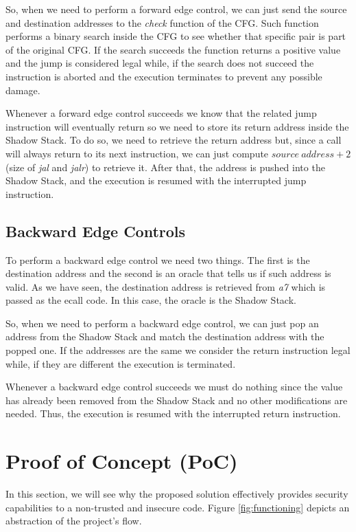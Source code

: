 So, when we need to perform a forward edge control, we can just send the source and
destination addresses to the \textit{check} function of the CFG. Such function performs
a binary search inside the CFG to see whether that specific pair is part of the original
CFG. If the search succeeds the function returns a positive value and the jump
is considered legal while, if the search does not succeed the instruction is aborted
and the execution terminates to prevent any possible damage.

Whenever a forward edge control succeeds we know that the related jump instruction
will eventually return so we need to store its return address inside the Shadow Stack.
To do so, we need to retrieve the return address but, since a call will always
return to its next instruction, we can just compute $source \ address + 2$ (size
of \textit{jal} and \textit{jalr}) to retrieve it. After that, the address is pushed
into the Shadow Stack, and the execution is resumed with the interrupted jump
instruction.

\subsection{Backward Edge Controls}
\label{subsec:backward}

To perform a backward edge control we need two things. The first is the
destination address and the second is an oracle that tells us if such address is
valid. As we have seen, the destination address is retrieved from \textit{a7} which
is passed as the ecall code. In this case, the oracle is the Shadow Stack.

So, when we need to perform a backward edge control, we can just pop an address from
the Shadow Stack and match the destination address with the popped one. If the
addresses are the same we consider the return instruction legal while, if they are
different the execution is terminated.

Whenever a backward edge control succeeds we must do nothing since the value has
already been removed from the Shadow Stack and no other modifications are needed.
Thus, the execution is resumed with the interrupted return instruction.

\section{Proof of Concept (PoC)}
\label{sec:project_poc}

In this section, we will see why the proposed solution effectively provides security
capabilities to a non-trusted and insecure code. Figure \ref{fig:functioning}
depicts an abstraction of the project's flow.

